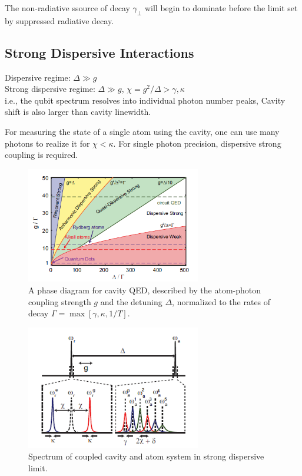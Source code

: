 \documentclass[8pt,a4paper,twocolumn]{article} %
\numberwithin{equation}{section} %
\begin{document}
			The non-radiative ssource of decay $\gamma_{\perp}$ will begin to dominate before the limit set by suppressed radiative decay.


		\subsection{Strong Dispersive Interactions} %
		\label{sub:strong_dispersive_interactions}
			Dispersive regime: $\Delta\gg g$\\
			Strong dispersive regime: $\Delta\gg g$, $\chi = g^2/\Delta > \gamma, \kappa$\\
			i.e., the qubit spectrum resolves into individual photon number peaks, Cavity shift is also larger than cavity linewidth.

			For measuring the state of a single atom using the cavity, one can use many photons to realize it for $\chi<\kappa$. For single photon precision, dispersive strong coupling is required.

			\begin{figure}[!h]
				\centering
				\includegraphics[width=3in]{cQEDphase.png}
				\caption{A phase diagram for cavity QED, described by the atom-photon coupling strength $g$ and the detuning $\Delta$, normalized to the rates of decay $\Gamma = \max[ \gamma,\kappa,1/T ]. $\cite{Schuster2007}}
				\label{pic:EnLevelOfJCH}
			\end{figure}

			\begin{figure}[!h]
				\centering
				\includegraphics[width=3in]{spectrumInSDlimit.png}
				\caption{Spectrum of coupled cavity and atom system in strong dispersive limit. \cite{Schuster2007}}
				\label{pic:EnLevelOfJCH}
			\end{figure}
\end{document}

